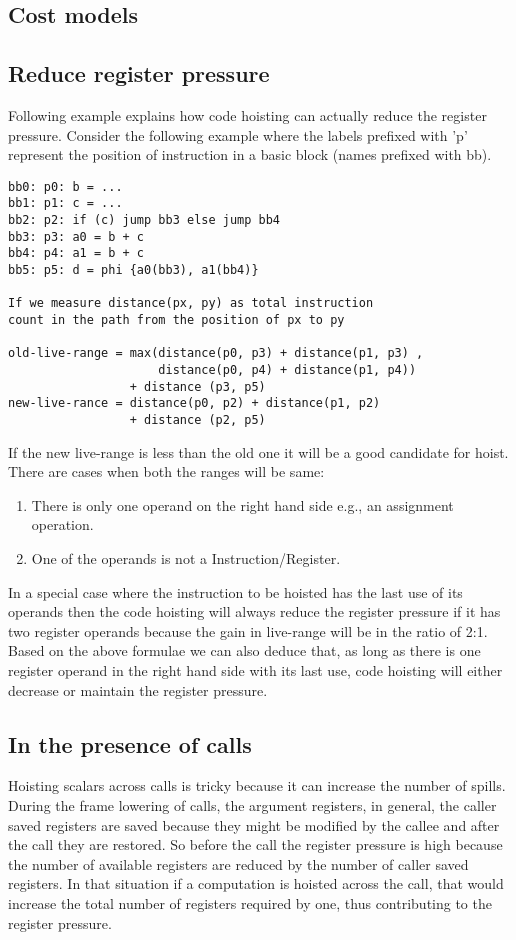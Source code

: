 \documentclass{sig-alternate}
\begin{document}
\subsection{Cost models}

\subsection{Reduce register pressure}
\label{hoist:reg-pressure}
Following example explains how code hoisting can actually reduce the register pressure.
Consider the following example where the labels prefixed with 'p' represent the position of
instruction in a basic block (names prefixed with bb).

\begin{verbatim}
bb0: p0: b = ...
bb1: p1: c = ...
bb2: p2: if (c) jump bb3 else jump bb4
bb3: p3: a0 = b + c
bb4: p4: a1 = b + c
bb5: p5: d = phi {a0(bb3), a1(bb4)}

If we measure distance(px, py) as total instruction
count in the path from the position of px to py

old-live-range = max(distance(p0, p3) + distance(p1, p3) ,
                     distance(p0, p4) + distance(p1, p4))
                 + distance (p3, p5)
new-live-rance = distance(p0, p2) + distance(p1, p2)
                 + distance (p2, p5)
\end{verbatim}

If the new live-range is less than the old one it will be a good candidate
for hoist. There are cases when both the ranges will be same:
\begin{enumerate}
  \item There is only one operand on the right hand side e.g., an assignment operation.
  \item One of the operands is not a Instruction/Register.
\end{enumerate}

In a special case where the instruction to be hoisted has the last use of its
operands then the code hoisting will always reduce the register pressure if it
has two register operands because the gain in live-range will be in the ratio of
2:1. Based on the above formulae we can also deduce that, as long as there is
one register operand in the right hand side with its last use, code hoisting
will either decrease or maintain the register pressure.

\subsection{In the presence of calls}
Hoisting scalars across calls is tricky because it can increase the number of
spills. During the frame lowering of calls, the argument registers, in general,
the caller saved registers are saved because they might be modified by the
callee and after the call they are restored. So before the call the register
pressure is high because the number of available registers are reduced by the
number of caller saved registers. In that situation if a computation is hoisted
across the call, that would increase the total number of registers required by
one, thus contributing to the register pressure.
\end{document}
